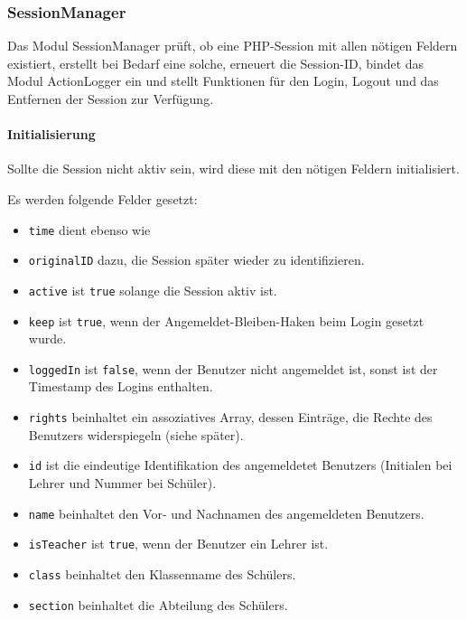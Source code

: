 \subsubsection{SessionManager}
\label{sec:content_imple_base_session}
Das Modul SessionManager prüft, ob eine PHP-Session mit allen nötigen Feldern existiert, erstellt bei Bedarf eine solche, erneuert die Session-ID, bindet das Modul ActionLogger ein und stellt Funktionen für den Login, Logout und das Entfernen der Session zur Verfügung.\\
\paragraph{Initialisierung\\}
Sollte die Session nicht aktiv sein, wird diese mit den nötigen Feldern initialisiert.

Es werden folgende Felder gesetzt:
\begin{itemize}
	\item \texttt{time} dient ebenso wie
	\item \texttt{originalID} dazu, die Session später wieder zu identifizieren.
	\item \texttt{active} ist \texttt{true} solange die Session aktiv ist.
	\item \texttt{keep} ist \texttt{true}, wenn der Angemeldet-Bleiben-Haken beim Login gesetzt wurde.
	\item \texttt{loggedIn} ist \texttt{false}, wenn der Benutzer nicht angemeldet ist, sonst ist der Timestamp des Logins enthalten.
	\item \texttt{rights} beinhaltet ein assoziatives Array, dessen Einträge, die Rechte des Benutzers widerspiegeln (siehe später).
	\item \texttt{id} ist die eindeutige Identifikation des angemeldetet Benutzers (Initialen bei Lehrer und Nummer bei Schüler).
	\item \texttt{name} beinhaltet den Vor- und Nachnamen des angemeldeten Benutzers.
	\item \texttt{isTeacher} ist \texttt{true}, wenn der Benutzer ein Lehrer ist.
	\item \texttt{class} beinhaltet den Klassenname des Schülers.
	\item \texttt{section} beinhaltet die Abteilung des Schülers.
\end{itemize}

